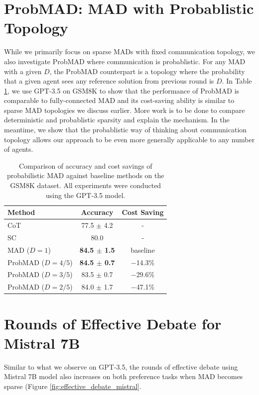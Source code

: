 \documentclass[11pt]{article}
\begin{document}
\section{ProbMAD: MAD with Probablistic Topology}
\label{appendix:probmad}
While we primarily focus on sparse MADs with fixed communication topology, we also investigate ProbMAD where communication is probablistic. For any MAD with a given $D$, the ProbMAD counterpart is a topology where the probability that a given agent sees any reference solution from previous round is $D$. In Table \ref{table:gsm8k_probablistic}, we use GPT-3.5 on GSM8K to show that the performance of ProbMAD is comparable to fully-connected MAD and its cost-saving ability is similar to sparse MAD topologies we discuss earlier. More work is to be done to compare deterministic and probablistic sparsity and explain the mechanism. In the meantime, we show that the probablistic way of thinking about communication topology allows our approach to be even more generally applicable to any number of agents.

\begin{table}[t]
  \centering
  \begin{tabular}{l|cc}
    \hline
    \textbf{Method} & Accuracy & Cost Saving \\
    \hline
    CoT & 77.5 $\pm$ 4.2 &  - \\
    SC  & 80.0 &  - \\
    \hline
    MAD ($D=1$) & \textbf{84.5 $\pm$ 1.5} & baseline \\
    ProbMAD ($D=4/5$) & \textbf{84.5 $\pm$ 0.7} & $-$14.3\% \\
    ProbMAD ($D=3/5$) & 83.5 $\pm$ 0.7 & $-$29.6\% \\
    ProbMAD ($D=2/5$) & 84.0 $\pm$ 1.7 & $-$47.1\% \\
    \hline
  \end{tabular}
\caption{Comparison of accuracy and cost savings of probabilistic MAD against baseline methods on the GSM8K dataset. All experiments were conducted using the GPT-3.5 model.}
\label{table:gsm8k_probablistic}
\end{table}


\section{Rounds of Effective Debate for Mistral 7B}
Similar to what we observe on GPT-3.5, the rounds of effective debate using Mistral 7B model also increases on both preference tasks when MAD becomes sparse (Figure \ref{fig:effective_debate_mistral}.
\end{document}
